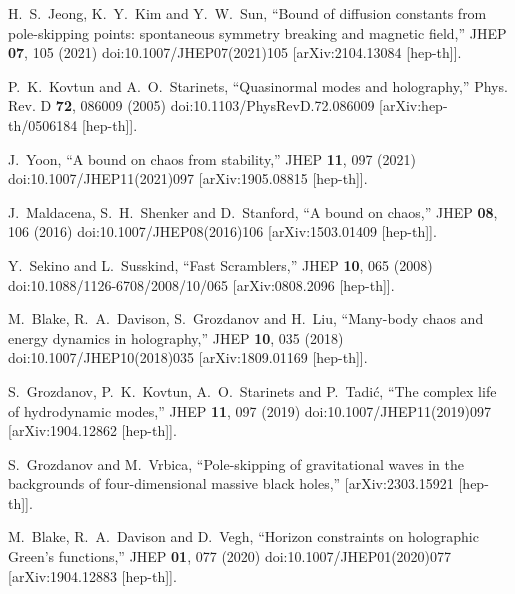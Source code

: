 \documentclass[preprintnumbers,aps,prd,longbibliography,nofootinbib,nobibnotes,amsmath,amssymb]{revtex4}
\begin{document}
\begin{thebibliography}{99}
H.~S.~Jeong, K.~Y.~Kim and Y.~W.~Sun,
``Bound of diffusion constants from pole-skipping points: spontaneous symmetry breaking and magnetic field,''
JHEP \textbf{07}, 105 (2021)
doi:10.1007/JHEP07(2021)105
[arXiv:2104.13084 [hep-th]].

P.~K.~Kovtun and A.~O.~Starinets,
``Quasinormal modes and holography,''
Phys. Rev. D \textbf{72}, 086009 (2005)
doi:10.1103/PhysRevD.72.086009
[arXiv:hep-th/0506184 [hep-th]].

J.~Yoon,
``A bound on chaos from stability,''
JHEP \textbf{11}, 097 (2021)
doi:10.1007/JHEP11(2021)097
[arXiv:1905.08815 [hep-th]].

J.~Maldacena, S.~H.~Shenker and D.~Stanford,
``A bound on chaos,''
JHEP \textbf{08}, 106 (2016)
doi:10.1007/JHEP08(2016)106
[arXiv:1503.01409 [hep-th]].

Y.~Sekino and L.~Susskind,
``Fast Scramblers,''
JHEP \textbf{10}, 065 (2008)
doi:10.1088/1126-6708/2008/10/065
[arXiv:0808.2096 [hep-th]].

M.~Blake, R.~A.~Davison, S.~Grozdanov and H.~Liu,
``Many-body chaos and energy dynamics in holography,''
JHEP \textbf{10}, 035 (2018)
doi:10.1007/JHEP10(2018)035
[arXiv:1809.01169 [hep-th]].

S.~Grozdanov, P.~K.~Kovtun, A.~O.~Starinets and P.~Tadi\'c,
``The complex life of hydrodynamic modes,''
JHEP \textbf{11}, 097 (2019)
doi:10.1007/JHEP11(2019)097
[arXiv:1904.12862 [hep-th]].




S.~Grozdanov and M.~Vrbica,
``Pole-skipping of gravitational waves in the backgrounds of four-dimensional massive black holes,''
[arXiv:2303.15921 [hep-th]].

M.~Blake, R.~A.~Davison and D.~Vegh,
``Horizon constraints on holographic Green\textquoteright{}s functions,''
JHEP \textbf{01}, 077 (2020)
doi:10.1007/JHEP01(2020)077
[arXiv:1904.12883 [hep-th]].


\end{thebibliography}
\end{document}

